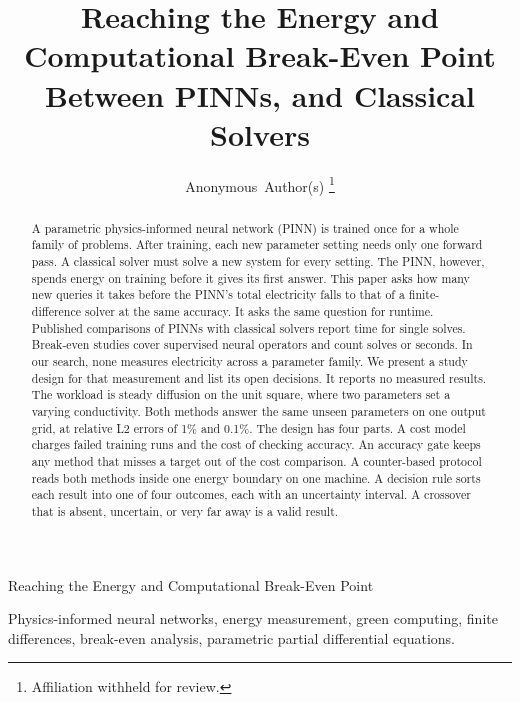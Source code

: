 \documentclass[journal]{IEEEtran}
\begin{document}

\title{Reaching the Energy and Computational Break-Even Point Between PINNs, and Classical Solvers}

\author{Anonymous~Author(s)%
\thanks{Affiliation withheld for review.}}

%
{Reaching the Energy and Computational Break-Even Point}

\maketitle

\begin{abstract}
A parametric physics-informed neural network (PINN) is trained once for a whole family of problems. After training, each new parameter setting needs only one forward pass. A classical solver must solve a new system for every setting. The PINN, however, spends energy on training before it gives its first answer. This paper asks how many new queries it takes before the PINN's total electricity falls to that of a finite-difference solver at the same accuracy. It asks the same question for runtime. Published comparisons of PINNs with classical solvers report time for single solves. Break-even studies cover supervised neural operators and count solves or seconds. In our search, none measures electricity across a parameter family. We present a study design for that measurement and list its open decisions. It reports no measured results. The workload is steady diffusion on the unit square, where two parameters set a varying conductivity. Both methods answer the same unseen parameters on one output grid, at relative L2 errors of 1\% and 0.1\%. The design has four parts. A cost model charges failed training runs and the cost of checking accuracy. An accuracy gate keeps any method that misses a target out of the cost comparison. A counter-based protocol reads both methods inside one energy boundary on one machine. A decision rule sorts each result into one of four outcomes, each with an uncertainty interval. A crossover that is absent, uncertain, or very far away is a valid result.
\end{abstract}

\begin{IEEEkeywords}
Physics-informed neural networks, energy measurement, green computing, finite differences, break-even analysis, parametric partial differential equations.
\end{IEEEkeywords}
\end{document}
